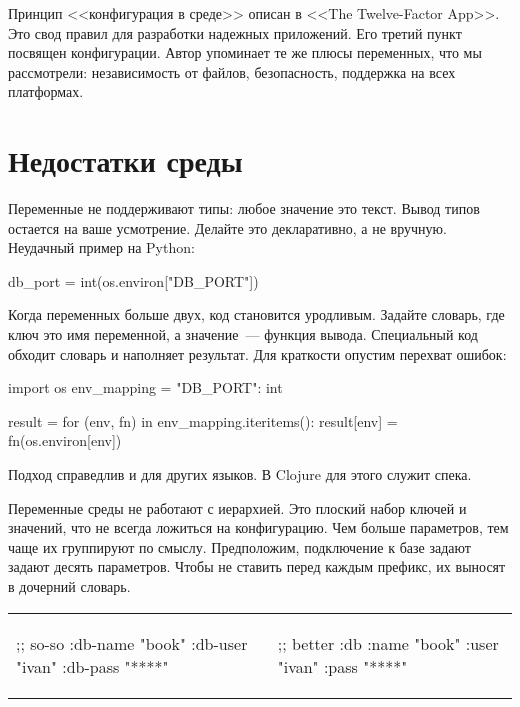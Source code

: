Принцип <<конфигурация в среде>> описан в <<The Twelve-Factor
App>>. Это свод правил для разработки надежных
приложений. Его третий пункт посвящен конфигурации. Автор упоминает те же плюсы
переменных, что мы рассмотрели: независимость от файлов, безопасность, поддержка
на всех платформах.

\section{Недостатки среды}

Переменные не поддерживают типы: любое значение это текст. Вывод типов остается
на ваше усмотрение. Делайте это декларативно, а не вручную. Неудачный пример на
Python:

\begin{english}
  \begin{python}
db_port = int(os.environ["DB_PORT"])
  \end{python}
\end{english}

Когда переменных больше двух, код становится уродливым. Задайте словарь, где
ключ это имя переменной, а значение~--- функция вывода. Специальный код обходит
словарь и наполняет результат. Для краткости опустим перехват ошибок:

\begin{english}
  \begin{python}
import os
env_mapping = {"DB_PORT": int}

result = {}
for (env, fn) in env_mapping.iteritems():
    result[env] = fn(os.environ[env])
  \end{python}
\end{english}

\noindent
Подход справедлив и для других языков. В Clojure для этого служит спека.

Переменные среды не работают с иерархией. Это плоский набор ключей и значений,
что не всегда ложиться на конфигурацию. Чем больше параметров, тем чаще их
группируют по смыслу. Предположим, подключение к базе задают задают десять
параметров. Чтобы не ставить перед каждым префикс, их выносят в дочерний
словарь.

\noindent
\begin{tabular}{ @{}p{5cm} @{}p{5cm} }

\begin{english}
  \begin{clojure}
;; so-so
{:db-name "book"
 :db-user "ivan"
 :db-pass "****"}
  \end{clojure}
\end{english}

&

\begin{english}
  \begin{clojure}
;; better
{:db {:name "book"
      :user "ivan"
      :pass "****"}}
  \end{clojure}
\end{english}

\end{tabular}

